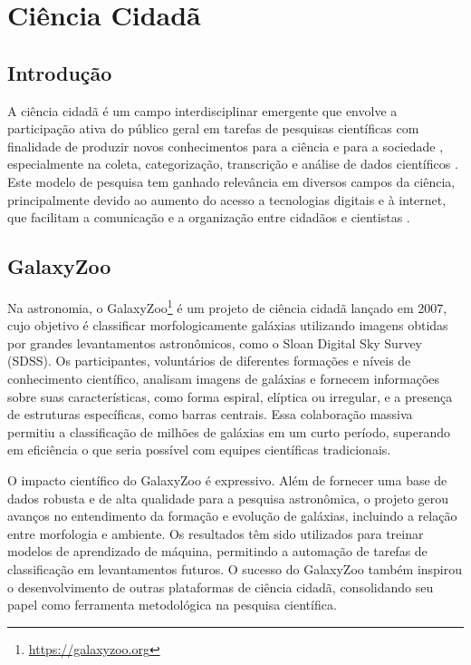 \chapter{Ciência Cidadã}
\label{cap:cs}

\begin{overview}
  \lipsum[1]
\end{overview}


\section{Introdução}
A ciência cidadã é um campo interdisciplinar emergente que envolve a participação ativa do público geral em tarefas de pesquisas científicas com finalidade de produzir novos conhecimentos para a ciência e para a sociedade \cite{scs-1}, especialmente na coleta, categorização, transcrição e análise de dados científicos \cite{silvertown2009,bonney2014}. Este modelo de pesquisa tem ganhado relevância em diversos campos da ciência, principalmente devido ao aumento do acesso a tecnologias digitais e à internet, que facilitam a comunicação e a organização entre cidadãos e cientistas \cite{scs-4}.

\section{GalaxyZoo}
Na astronomia, o GalaxyZoo\footnote{\url{https://galaxyzoo.org}} \cite{gz} é um projeto de ciência cidadã lançado em 2007, cujo objetivo é classificar morfologicamente galáxias utilizando imagens obtidas por grandes levantamentos astronômicos, como o Sloan Digital Sky Survey (SDSS). Os participantes, voluntários de diferentes formações e níveis de conhecimento científico, analisam imagens de galáxias e fornecem informações sobre suas características, como forma espiral, elíptica ou irregular, e a presença de estruturas específicas, como barras centrais. Essa colaboração massiva permitiu a classificação de milhões de galáxias em um curto período, superando em eficiência o que seria possível com equipes científicas tradicionais.

O impacto científico do GalaxyZoo é expressivo. Além de fornecer uma base de dados robusta e de alta qualidade para a pesquisa astronômica, o projeto gerou avanços no entendimento da formação e evolução de galáxias, incluindo a relação entre morfologia e ambiente. Os resultados têm sido utilizados para treinar modelos de aprendizado de máquina, permitindo a automação de tarefas de classificação em levantamentos futuros. O sucesso do GalaxyZoo também inspirou o desenvolvimento de outras plataformas de ciência cidadã, consolidando seu papel como ferramenta metodológica na pesquisa científica.

